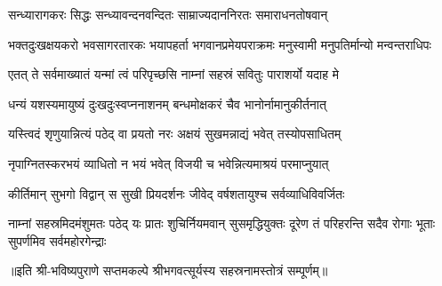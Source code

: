 \twolineshloka
{सन्ध्यारागकरः सिद्धः सन्ध्यावन्दनवन्दितः}
{साम्राज्यदाननिरतः समाराधनतोषवान्}%

\threelineshloka
{भक्तदुःखक्षयकरो भवसागरतारकः}
{भयापहर्ता भगवानप्रमेयपराक्रमः}
{मनुस्वामी मनुपतिर्मान्यो मन्वन्तराधिपः}%

\resetShloka
\twolineshloka
{एतत् ते सर्वमाख्यातं यन्मां त्वं परिपृच्छसि}
{नाम्नां सहस्रं सवितुः पाराशर्यो यदाह मे}

\twolineshloka
{धन्यं यशस्यमायुष्यं दुःखदुःस्वप्ननाशनम्}
{बन्धमोक्षकरं चैव भानोर्नामानुकीर्तनात्}

\twolineshloka
{यस्त्विदं शृणुयान्नित्यं पठेद् वा प्रयतो नरः}
{अक्षयं सुखमन्नाद्यं भवेत् तस्योपसाधितम्}

\twolineshloka
{नृपाग्नितस्करभयं व्याधितो न भयं भवेत्}
{विजयी च भवेन्नित्यमाश्रयं परमाप्नुयात्}

\twolineshloka
{कीर्तिमान् सुभगो विद्वान् स सुखी प्रियदर्शनः}
{जीवेद् वर्षशतायुश्च सर्वव्याधिविवर्जितः}

\fourlineindentedshloka
{नाम्नां सहस्रमिदमंशुमतः पठेद् यः}
{प्रातः शुचिर्नियमवान् सुसमृद्धियुक्तः}
{दूरेण तं परिहरन्ति सदैव रोगाः}
{भूताः सुपर्णमिव सर्वमहोरगेन्द्राः}

॥इति श्री-भविष्यपुराणे सप्तमकल्पे श्रीभगवत्सूर्यस्य सहस्रनामस्तोत्रं सम्पूर्णम्॥